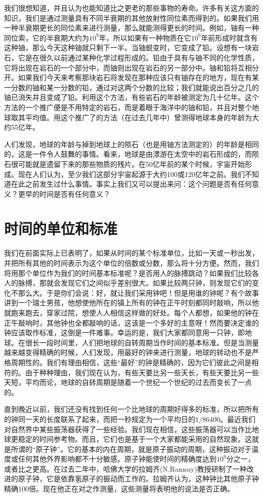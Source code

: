 \documentclass[11pt,oneside]{book}
\begin{document}
\begin{common-format}
我们很想知道，并且认为也能知道比之更老的那些事物的寿命。许多有关这方面的知识，我们是通过测量具有不同半衰期的其他放射性同位素而得到的。如果我们用一种半衰期更长的同位素来进行测量，那么就能测得更长的时间。例如，铀有一种同位索，它的半衰期大约为$ 10^9 $年，所以如果有一种物质在它$ 10^9 $年前形成时就含有这种铀，那么今天这种铀就只剩下一半。当铀蜕变时，它变成了铅。设想有一块岩石，它是在很久以前通过某种化学过程形成的。铅由于具有与铀不同的化学性质，它将出现在岩石的一个部分中，而铀则出现在岩石的另一部分中。铀和铅将互相分开。如果我们今天来考察那块岩石将发现在那种应该只有铀存在的地方，现在有某一分数的铀和某一分数的铅，通过对这两个分数的比较；我们就能说出百分之几的铀已消失并且变成了铅。利用这个方法，有些岩石的年龄被测定为几十亿年。这个方法的一个推广便是不用特定的岩石，而是着眼于海洋中的铀和铅，并且对整个地球取其平均值。用这个推广了的方法（在过去几年中）曾测得地球本身的年龄为大约55亿年。

人们发现，地球的年龄与掉到地球上的陨石（也是用铀方法测定的）的年龄是相同的，这是一件令人鼓舞的事情。看来，地球是由漂游在太空中的岩石形成的，而陨石很可能就是遗留下来的那些物质的残片。在50亿年前的某个时候，宇宙开始形成。现在人们认为，至少我们这部分宇宙起源于大约100或120亿年之前。我们不知道在此之前发生过什么事情。事实上我们又可以提出来问：这个问题是否有任何意义？更早的时间是否有任何意义？


\section{时间的单位和标准}
我们在前面实际上已表明了，如果从时间的某个标准单位，比如一天或一秒出发，并把所有其他的时间表示为这个单位的倍数或分数，那么将十分方便。然而，我们将用那个单位作为我们的时间基本标准呢？是否用人的脉搏跳动？如果我们比较各人的脉搏，那就会发现它们之间似乎差别很大。如果比较两只钟，则发现它们的变化不那么大。于是你们会说：好，就让我们采用钟吧！但是用谁的钟呢？有个故事讲到一个瑞士男孩，他想使他所在的镇上所有的钟在正午时刻都同时敲响，所以他就跑来跑去，穿家过院，想使人人相信这样做的好处。每个人都想，如果他的钟在正午敲响时，其他钟也全都敲响的话，这该是一个多好的主意呀！然而要决定谁的钟应该取作标准，这倒是一件难事。幸运的是，我们大家都同意用一只钟，即地球。在很长一段时间里，人们把地球的自转周期当作时间的基本标准。但是当测量越来越变得精确的时候，人们发现，用最好的钟来进行测量，地球的转动也不是严格周期性的。我们有理由相信，这些“最好”的钟是精确的，因为它们彼此之间是相符的。由于种种理由，我们现在认为，有些天要比另一些天长，有些天要比另一些天短，平均而论，地球的自转周期是随着一个世纪一个世纪的过去而变长了一点的。

直到晚近以前，我们还没有找到任何一个比地球的周期好得多的标准，所以把所有的钟同一天的长度联系了起来，而把一秒规定为一个平均日的$  1/86400$。最近我们对自然界中某些振荡器获得了一些经验。我们现在相信，这些振荡器可以当作比地球更稳定的时间参考物。而且，它们也是基于一个大家都能采用的自然现象。这就是所谓的“原子钟”。它的基本的内在周期，就是原子振动的周期，这种振动对于温度或任何其他外界影响都不十分敏感。原子钟能使时间的精确度达到$ 10^9 $分之一，或者比之更高。在过去二年中，哈佛大学的拉姆齐(N.Ramsay)教授研制了一种改进的原子钟，它是依靠氢原子的振动而工作的。拉姆齐认为，这种钟比其他原子钟精确100倍。现在他正在对之作测量，这些测量将表明他的说法是否正确。


\end{common-format}
\end{document}
